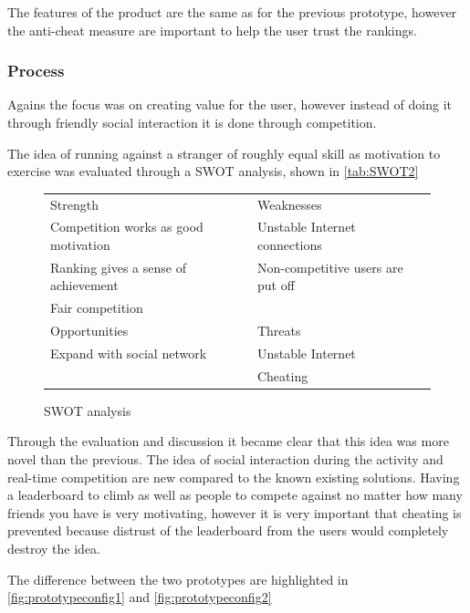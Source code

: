 The features of the product are the same as for the previous prototype, however the anti-cheat measure are important to help the user trust the rankings.

\subsubsection{Process}
Agains the focus was on creating value for the user, however instead of doing it through friendly social interaction it is done through competition. 
\vspace{10pt}

The idea of running against a stranger of roughly equal skill as motivation to exercise was evaluated through a \ac{SWOT} analysis, shown in \autoref{tab:SWOT2}

\begin{figure}[ht]
 \caption{SWOT analysis}
 \label{tab:SWOT2}
 \begin{tabular}{| l | l |}
 \hline
Strength & Weaknesses \\ 
Competition works as good motivation & Unstable Internet connections \\ 
Ranking gives a sense of achievement & Non-competitive users are put off \\
Fair competition & \\ \hline
Opportunities & Threats \\ 
Expand with social network & Unstable Internet \\
 & Cheating \\
\hline
 \end{tabular}
\end{figure}
\vspace{10pt}

Through the evaluation and discussion it became clear that this idea was more novel than the previous. The idea of social interaction during the activity and real-time competition are new compared to the known existing solutions. Having a leaderboard to climb as well as people to compete against no matter how many friends you have is very motivating, however it is very important that cheating is prevented because distrust of the leaderboard from the users would completely destroy the idea.

The difference between the two prototypes are highlighted in \autoref{fig:prototypeconfig1} and \autoref{fig:prototypeconfig2}

